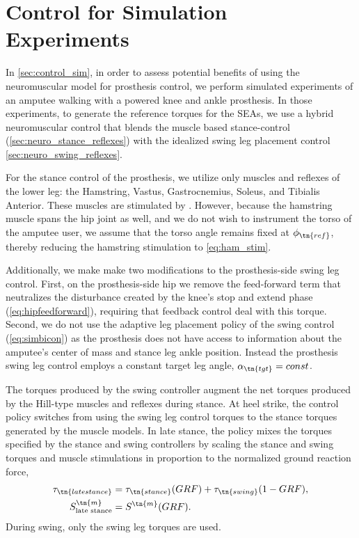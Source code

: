 \section{Control for Simulation Experiments}
In \cref{sec:control_sim}, in order to assess potential benefits of using the
neuromuscular model for prosthesis control, we perform simulated experiments of
an amputee walking with a powered knee and ankle prosthesis. In those
experiments, to generate the reference torques for the SEAs, we use a hybrid
neuromuscular control that blends the muscle based stance-control
(\cref{sec:neuro_stance_reflexes}) with the idealized swing leg placement
control \cref{sec:neuro_swing_reflexes}. 

For the stance control of the prosthesis, we utilize only muscles and reflexes
of the lower leg: the Hamstring, Vastus, Gastrocnemius, Soleus, and Tibialis
Anterior. These muscles are stimulated by
. However, because the hamstring muscle
spans the hip joint as well, and we do not wish to instrument the torso of the
amputee user, we assume that the torso angle remains fixed at $\phi_\tn{ref}$, 
thereby reducing the hamstring stimulation to \cref{eq:ham_stim}.

Additionally, we make make two modifications to the prosthesis-side swing leg
control. First, on the prosthesis-side hip we remove the feed-forward term that
neutralizes the disturbance created by the knee's stop and extend phase
(\cref{eq:hipfeedforward}), requiring that feedback control deal with this
torque.  Second, we do not use the adaptive leg placement policy of the swing
control (\cref{eq:simbicon}) as the prosthesis does not have access to
information about the amputee's center of mass and stance leg ankle position.
Instead the prosthesis swing leg control employs a constant target leg angle,
$\alpha_\tn{tgt} = const$.

The torques produced by the swing controller augment the net torques produced by
the Hill-type muscles and reflexes during stance. At heel strike, the control
policy switches from using the swing leg control torques to the stance torques
generated by the muscle models. In late stance, the policy mixes the torques
specified by the stance and swing controllers by scaling the stance and swing
torques and muscle stimulations in proportion to the normalized ground reaction
force,
\begin{align}
    \tau_\tn{late stance} &= \tau_\tn{stance}(GRF) +
    \tau_\tn{swing}(1 - GRF), \label{eq:stance_grf_trans}\\ 
    S^\tn{m}_\textrm{late stance}  &= S^\tn{m}(GRF).\label{eq:swing_grf_trans}
\end{align}
During swing, only the swing leg torques are used.

